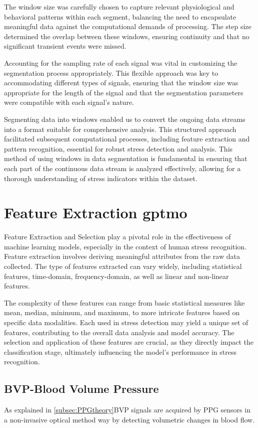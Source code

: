 The window size was carefully chosen to capture relevant physiological and behavioral patterns within each segment, balancing the need to encapsulate meaningful data against the computational demands of processing. The step size determined the overlap between these windows, ensuring continuity and that no significant transient events were missed.

Accounting for the sampling rate of each signal was vital in customizing the segmentation process appropriately. This flexible approach was key to accommodating different types of signals, ensuring that the window size was appropriate for the length of the signal and that the segmentation parameters were compatible with each signal's nature.

Segmenting data into windows enabled us to convert the ongoing data streams into a format suitable for comprehensive analysis. This structured approach facilitated subsequent computational processes, including feature extraction and pattern recognition, essential for robust stress detection and analysis. This method of using windows in data segmentation is fundamental in ensuring that each part of the continuous data stream is analyzed effectively, allowing for a thorough understanding of stress indicators within the dataset.

\section{Feature Extraction  \gls*{gptmo}}
Feature Extraction and Selection play a pivotal role in the effectiveness of machine learning models, especially in the context of human stress recognition. Feature extraction involves deriving meaningful attributes from the raw data collected. The type of features extracted can vary widely, including statistical features, time-domain, frequency-domain, as well as linear and non-linear features.

The complexity of these features can range from basic statistical measures like mean, median, minimum, and maximum, to more intricate features based on specific data modalities. Each  used in stress detection may yield a unique set of features, contributing to the overall data analysis and model accuracy. The selection and application of these features are crucial, as they directly impact the classification stage, ultimately influencing the model's performance in stress recognition.



\subsection{BVP-Blood Volume Pressure}
As explained in \ref*{subsec:PPGtheory}BVP signals are acquired by PPG sensors in a non-invasive optical method way by detecting volumetric changes in blood flow.


